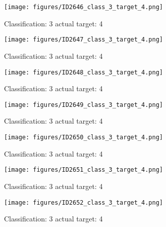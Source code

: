 \begin{figure}[h!]
\begin{center}
\texttt{[image: figures/ID2646\_class\_3\_target\_4.png]}
\end{center}
\caption{ Classification: 3 actual target: 4}
\label{fig:ID2646_class_3_target_4}
\end{figure}
\begin{figure}[h!]
\begin{center}
\texttt{[image: figures/ID2647\_class\_3\_target\_4.png]}
\end{center}
\caption{ Classification: 3 actual target: 4}
\label{fig:ID2647_class_3_target_4}
\end{figure}
\begin{figure}[h!]
\begin{center}
\texttt{[image: figures/ID2648\_class\_3\_target\_4.png]}
\end{center}
\caption{ Classification: 3 actual target: 4}
\label{fig:ID2648_class_3_target_4}
\end{figure}
\begin{figure}[h!]
\begin{center}
\texttt{[image: figures/ID2649\_class\_3\_target\_4.png]}
\end{center}
\caption{ Classification: 3 actual target: 4}
\label{fig:ID2649_class_3_target_4}
\end{figure}
\begin{figure}[h!]
\begin{center}
\texttt{[image: figures/ID2650\_class\_3\_target\_4.png]}
\end{center}
\caption{ Classification: 3 actual target: 4}
\label{fig:ID2650_class_3_target_4}
\end{figure}
\begin{figure}[h!]
\begin{center}
\texttt{[image: figures/ID2651\_class\_3\_target\_4.png]}
\end{center}
\caption{ Classification: 3 actual target: 4}
\label{fig:ID2651_class_3_target_4}
\end{figure}
\begin{figure}[h!]
\begin{center}
\texttt{[image: figures/ID2652\_class\_3\_target\_4.png]}
\end{center}
\caption{ Classification: 3 actual target: 4}
\label{fig:ID2652_class_3_target_4}
\end{figure}
